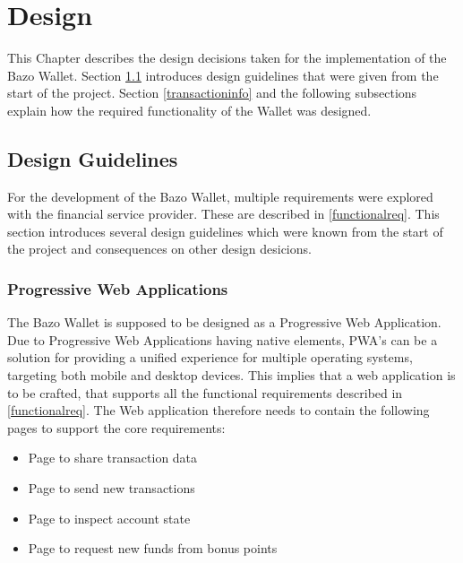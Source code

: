 \chapter{Design}\label{design}
This Chapter describes the design decisions taken for the implementation of the Bazo Wallet. Section \ref{designguide} introduces design guidelines that were given from the start of the project. Section \ref{transactioninfo} and the following subsections explain how the required functionality of the Wallet was designed.
\section{Design Guidelines}\label{designguide}
For the development of the Bazo Wallet, multiple requirements were explored with the financial service provider. These are described in \ref{functionalreq}. This section introduces several design guidelines which were known from the start of the project and consequences on other design desicions.
\subsection{Progressive Web Applications}
The Bazo Wallet is supposed to be designed as a Progressive Web Application. Due to Progressive Web Applications having native elements, PWA's can be a solution for providing a unified experience for multiple operating systems, targeting both mobile and desktop devices. This implies that a web application is to be crafted, that supports all the functional requirements described in \ref{functionalreq}. The Web application therefore needs to contain the following pages to support the core requirements:
\begin{itemize}
\item Page to share transaction data
\item Page to send new transactions
\item Page to inspect account state
\item Page to request new funds from bonus points
\end{itemize}

